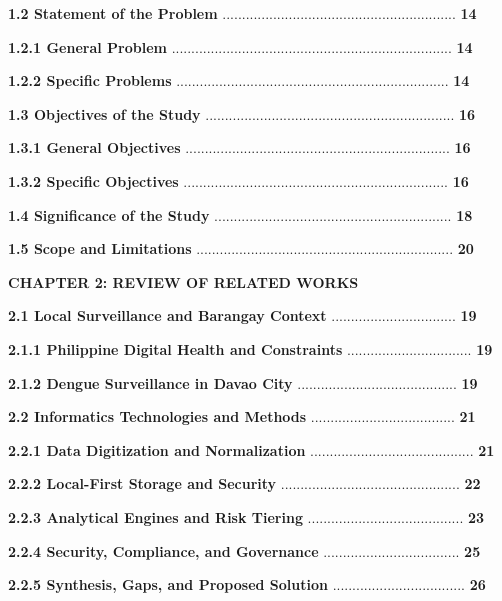\documentclass[
]{article}
\begin{document}
\textbf{1.2 Statement of the Problem}
............................................................ \textbf{14}

\textbf{1.2.1 General Problem}
........................................................................
\textbf{14}

\textbf{1.2.2 Specific Problems}
......................................................................
\textbf{14}

\textbf{1.3 Objectives of the Study}
................................................................
\textbf{16}

\textbf{1.3.1 General Objectives}
....................................................................
\textbf{16}

\textbf{1.3.2 Specific Objectives}
....................................................................
\textbf{16}

\textbf{1.4 Significance of the Study}
.............................................................
\textbf{18}

\textbf{1.5 Scope and Limitations}
..................................................................
\textbf{20}

\textbf{CHAPTER 2: REVIEW OF RELATED WORKS}

\textbf{2.1 Local Surveillance and Barangay Context}
................................ \textbf{19}

\textbf{2.1.1 Philippine Digital Health and Constraints}
................................ \textbf{19}

\textbf{2.1.2 Dengue Surveillance in Davao City}
......................................... \textbf{19}

\textbf{2.2 Informatics Technologies and Methods}
..................................... \textbf{21}

\textbf{2.2.1 Data Digitization and Normalization}
.......................................... \textbf{21}

\textbf{2.2.2 Local-First Storage and Security}
.............................................. \textbf{22}

\textbf{2.2.3 Analytical Engines and Risk Tiering}
........................................ \textbf{23}

\textbf{2.2.4 Security, Compliance, and Governance}
................................... \textbf{25}

\textbf{2.2.5 Synthesis, Gaps, and Proposed Solution}
.................................. \textbf{26}
\end{document}

